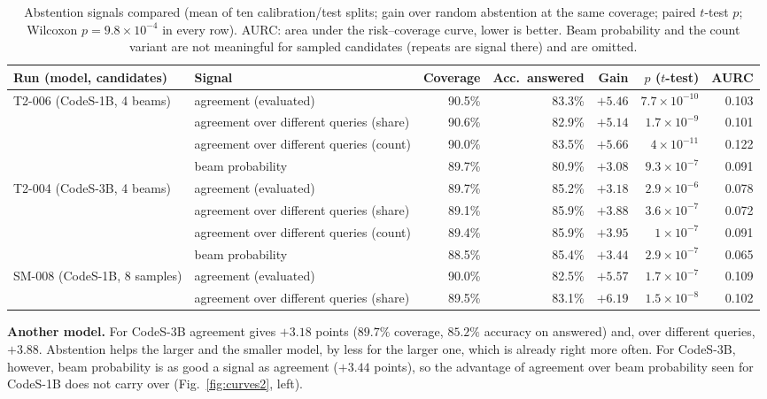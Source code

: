 \documentclass[conference]{IEEEtran}
\begin{document}
\begin{table}[t]
\centering
\caption{Abstention signals compared (mean of ten calibration/test splits; gain over random abstention at the same coverage; paired $t$-test $p$; Wilcoxon $p=9.8\times10^{-4}$ in every row). AURC: area under the risk--coverage curve, lower is better. Beam probability and the count variant are not meaningful for sampled candidates (repeats are signal there) and are omitted.}
\label{tab:signals}
\small
\begin{tabular}{@{}llrrrrr@{}}
\toprule
Run (model, candidates) & Signal & Coverage & Acc.\ answered & Gain & $p$ ($t$-test) & AURC \\
\midrule
\multirow{4}{*}{T2-006 (CodeS-1B, 4 beams)} & agreement (evaluated) & 90.5\% & 83.3\% & $+5.46$ & $7.7\times10^{-10}$ & 0.103 \\
 & agreement over different queries (share) & 90.6\% & 82.9\% & $+5.14$ & $1.7\times10^{-9}$ & 0.101 \\
 & agreement over different queries (count) & 90.0\% & 83.5\% & $+5.66$ & $4\times10^{-11}$ & 0.122 \\
 & beam probability & 89.7\% & 80.9\% & $+3.08$ & $9.3\times10^{-7}$ & 0.091 \\
\midrule
\multirow{4}{*}{T2-004 (CodeS-3B, 4 beams)} & agreement (evaluated) & 89.7\% & 85.2\% & $+3.18$ & $2.9\times10^{-6}$ & 0.078 \\
 & agreement over different queries (share) & 89.1\% & 85.9\% & $+3.88$ & $3.6\times10^{-7}$ & 0.072 \\
 & agreement over different queries (count) & 89.4\% & 85.9\% & $+3.95$ & $1\times10^{-7}$ & 0.091 \\
 & beam probability & 88.5\% & 85.4\% & $+3.44$ & $2.9\times10^{-7}$ & 0.065 \\
\midrule
\multirow{2}{*}{SM-008 (CodeS-1B, 8 samples)} & agreement (evaluated) & 90.0\% & 82.5\% & $+5.57$ & $1.7\times10^{-7}$ & 0.109 \\
 & agreement over different queries (share) & 89.5\% & 83.1\% & $+6.19$ & $1.5\times10^{-8}$ & 0.102 \\
\bottomrule
\end{tabular}
\end{table}

\textbf{Another model.} For CodeS-3B agreement gives $+3.18$ points ($89.7\%$ coverage, $85.2\%$ accuracy on answered) and, over different queries, $+3.88$. Abstention helps the larger and the smaller model, by less for the larger one, which is already right more often. For CodeS-3B, however, beam probability is as good a signal as agreement ($+3.44$ points), so the advantage of agreement over beam probability seen for CodeS-1B does not carry over (Fig.~\ref{fig:curves2}, left).
\end{document}
